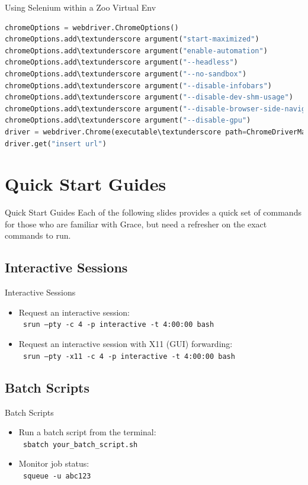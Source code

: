 \documentclass[10pt,xcolor={svgnames}]{beamer}
\begin{document}
\begin{frame}[fragile]{Using Selenium within a Zoo Virtual Env}
\footnotesize
\begin{lstlisting}[language=python]
chromeOptions = webdriver.ChromeOptions()
chromeOptions.add\textunderscore argument("start-maximized")
chromeOptions.add\textunderscore argument("enable-automation")
chromeOptions.add\textunderscore argument("--headless")
chromeOptions.add\textunderscore argument("--no-sandbox")
chromeOptions.add\textunderscore argument("--disable-infobars")
chromeOptions.add\textunderscore argument("--disable-dev-shm-usage")
chromeOptions.add\textunderscore argument("--disable-browser-side-navigation")
chromeOptions.add\textunderscore argument("--disable-gpu")
driver = webdriver.Chrome(executable\textunderscore path=ChromeDriverManager().install(), options=chromeOptions)
driver.get("insert url")
\end{lstlisting}
\end{frame}


\section{Quick Start Guides}
\begin{frame}{Quick Start Guides}
Each of the following slides provides a quick set of commands for those who are familiar with Grace, but need a refresher on the exact commands to run.

\end{frame}


\subsection{Interactive Sessions}
\begin{frame}{Interactive Sessions}
\begin{itemize}
\item Request an interactive session: \\ \alert{\texttt{ srun --pty -c 4 -p interactive -t 4:00:00 bash}}
\item Request an interactive session with X11 (GUI) forwarding: \\ \alert{\texttt{ srun --pty -x11 -c 4 -p interactive -t 4:00:00 bash}}
\end{itemize}
\end{frame}

\subsection{Batch Scripts}
\begin{frame}{Batch Scripts}
\begin{itemize}
\item Run a batch script from the terminal:  \\ \alert{\texttt{ sbatch your\_batch\_script.sh}}
\item Monitor job status: \\ \alert{\texttt{ squeue -u abc123}}
\end{itemize}
\end{frame}
\end{document}
